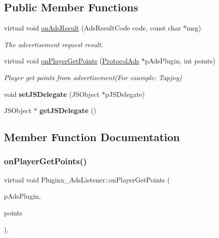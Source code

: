 \subsection*{Public Member Functions}
\begin{DoxyCompactItemize}
\item 
\mbox{\label{classPluginx__AdsListener_adc16591bf86046f503a898eb685c2718}} 
virtual void \hyperlink{classPluginx__AdsListener_adc16591bf86046f503a898eb685c2718}{on\+Ads\+Result} (Ads\+Result\+Code code, const char $\ast$msg)
\begin{DoxyCompactList}\small\item\em The advertisement request result. \end{DoxyCompactList}\item 
virtual void \hyperlink{classPluginx__AdsListener_a14d530bc495eebd7fe98bfad76e80d8c}{on\+Player\+Get\+Points} (\hyperlink{classcocos2d_1_1plugin_1_1ProtocolAds}{Protocol\+Ads} $\ast$p\+Ads\+Plugin, int points)
\begin{DoxyCompactList}\small\item\em Player get points from advertisement(\+For example\+: Tapjoy) \end{DoxyCompactList}\item 
\mbox{\label{classPluginx__AdsListener_a2a0aec38355bee0818b084d0b8ab58a0}} 
void {\bfseries set\+J\+S\+Delegate} (J\+S\+Object $\ast$p\+J\+S\+Delegate)
\item 
\mbox{\label{classPluginx__AdsListener_a1aac3c4c88fc67efbfe8962059907543}} 
J\+S\+Object $\ast$ {\bfseries get\+J\+S\+Delegate} ()
\end{DoxyCompactItemize}


\subsection{Member Function Documentation}
\mbox{\label{classPluginx__AdsListener_a14d530bc495eebd7fe98bfad76e80d8c}} 
\subsubsection{\texorpdfstring{on\+Player\+Get\+Points()}{onPlayerGetPoints()}}
{\footnotesize\ttfamily virtual void Pluginx\+\_\+\+Ads\+Listener\+::on\+Player\+Get\+Points (\begin{DoxyParamCaption}\item[{\hyperlink{classcocos2d_1_1plugin_1_1ProtocolAds}{Protocol\+Ads} $\ast$}]{p\+Ads\+Plugin,  }\item[{int}]{points }\end{DoxyParamCaption})\hspace{0.3cm}{\ttfamily [inline]}, {\ttfamily [virtual]}}



